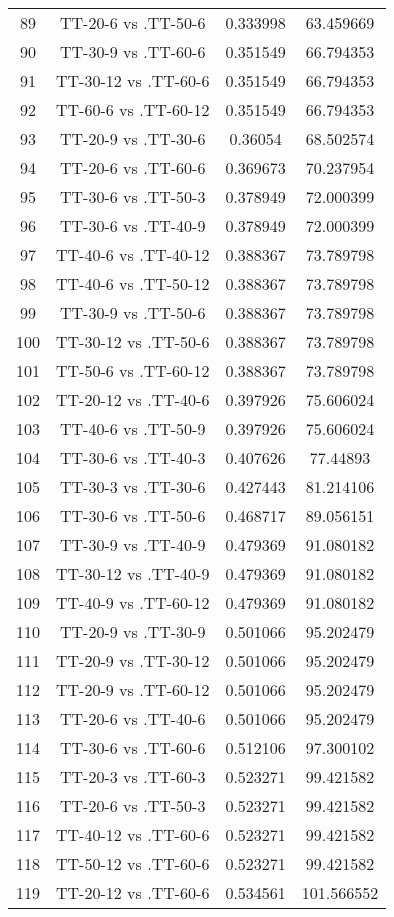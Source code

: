 \documentclass[a4paper,10pt]{article}
\begin{document}
\begin{landscape}
\begin{table}[!htp]
\begin{tabular}{cccc}
89&TT-20-6 vs .TT-50-6&0.333998&63.459669\\
90&TT-30-9 vs .TT-60-6&0.351549&66.794353\\
91&TT-30-12 vs .TT-60-6&0.351549&66.794353\\
92&TT-60-6 vs .TT-60-12&0.351549&66.794353\\
93&TT-20-9 vs .TT-30-6&0.36054&68.502574\\
94&TT-20-6 vs .TT-60-6&0.369673&70.237954\\
95&TT-30-6 vs .TT-50-3&0.378949&72.000399\\
96&TT-30-6 vs .TT-40-9&0.378949&72.000399\\
97&TT-40-6 vs .TT-40-12&0.388367&73.789798\\
98&TT-40-6 vs .TT-50-12&0.388367&73.789798\\
99&TT-30-9 vs .TT-50-6&0.388367&73.789798\\
100&TT-30-12 vs .TT-50-6&0.388367&73.789798\\
101&TT-50-6 vs .TT-60-12&0.388367&73.789798\\
102&TT-20-12 vs .TT-40-6&0.397926&75.606024\\
103&TT-40-6 vs .TT-50-9&0.397926&75.606024\\
104&TT-30-6 vs .TT-40-3&0.407626&77.44893\\
105&TT-30-3 vs .TT-30-6&0.427443&81.214106\\
106&TT-30-6 vs .TT-50-6&0.468717&89.056151\\
107&TT-30-9 vs .TT-40-9&0.479369&91.080182\\
108&TT-30-12 vs .TT-40-9&0.479369&91.080182\\
109&TT-40-9 vs .TT-60-12&0.479369&91.080182\\
110&TT-20-9 vs .TT-30-9&0.501066&95.202479\\
111&TT-20-9 vs .TT-30-12&0.501066&95.202479\\
112&TT-20-9 vs .TT-60-12&0.501066&95.202479\\
113&TT-20-6 vs .TT-40-6&0.501066&95.202479\\
114&TT-30-6 vs .TT-60-6&0.512106&97.300102\\
115&TT-20-3 vs .TT-60-3&0.523271&99.421582\\
116&TT-20-6 vs .TT-50-3&0.523271&99.421582\\
117&TT-40-12 vs .TT-60-6&0.523271&99.421582\\
118&TT-50-12 vs .TT-60-6&0.523271&99.421582\\
119&TT-20-12 vs .TT-60-6&0.534561&101.566552\\

\end{tabular}
\end{table}
\end{landscape}
\end{document}
